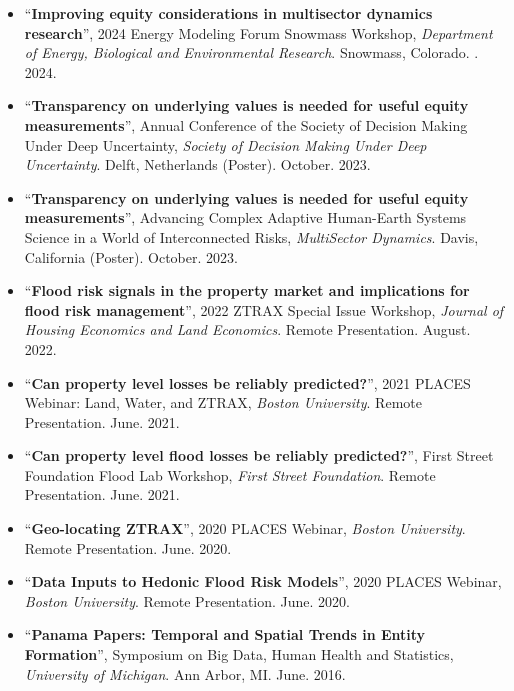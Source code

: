 \documentclass[10pt,oneside]{article}
\begin{document}
\begin{itemize}[label={}]
  
  \item \enquote{\textbf{Improving equity considerations in multisector dynamics research}}, 2024 Energy Modeling Forum Snowmass Workshop,  \textit{Department of Energy, Biological and Environmental Research}. Snowmass, Colorado.  . 2024.
        
  \item \enquote{\textbf{Transparency on underlying values is needed for useful equity measurements}}, Annual Conference of the Society of Decision Making Under Deep Uncertainty,  \textit{Society of Decision Making Under Deep Uncertainty}. Delft, Netherlands (Poster).  October. 2023.
        
  \item \enquote{\textbf{Transparency on underlying values is needed for useful equity measurements}}, Advancing Complex Adaptive Human-Earth Systems Science in a World of Interconnected Risks,  \textit{MultiSector Dynamics}. Davis, California (Poster).  October. 2023.
        
  \item \enquote{\textbf{Flood risk signals in the property market and implications for flood risk management}}, 2022 ZTRAX Special Issue Workshop,  \textit{Journal of Housing Economics and Land Economics}. Remote Presentation.  August. 2022.
        
  \item \enquote{\textbf{Can property level losses be reliably predicted?}}, 2021 PLACES Webinar: Land, Water, and ZTRAX,  \textit{Boston University}. Remote Presentation.  June. 2021.
        
  \item \enquote{\textbf{Can property level flood losses be reliably predicted?}}, First Street Foundation Flood Lab Workshop,  \textit{First Street Foundation}. Remote Presentation.  June. 2021.
        
  \item \enquote{\textbf{Geo-locating ZTRAX}}, 2020 PLACES Webinar,  \textit{Boston University}. Remote Presentation.  June. 2020.
        
  \item \enquote{\textbf{Data Inputs to Hedonic Flood Risk Models}}, 2020 PLACES Webinar,  \textit{Boston University}. Remote Presentation.  June. 2020.
        
  \item \enquote{\textbf{Panama Papers: Temporal and Spatial Trends in Entity Formation}}, Symposium on Big Data, Human Health and Statistics,  \textit{University of Michigan}. Ann Arbor, MI.  June. 2016.
        
\end{itemize}
\end{document}
